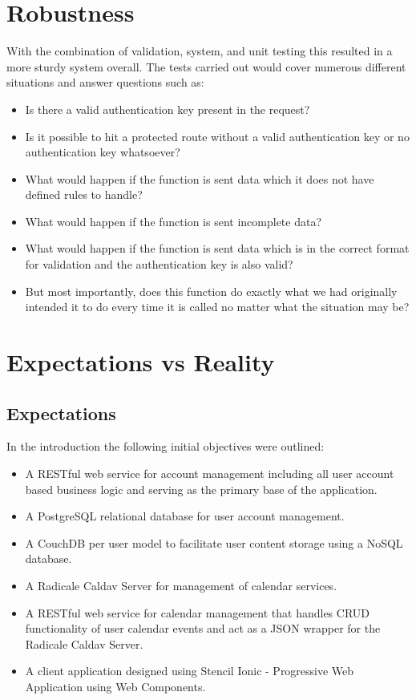 \section{Robustness}
	With the combination of validation, system, and unit testing this resulted in a more sturdy system overall. The tests carried out would cover numerous different situations and answer questions such as:
    \begin{itemize}
    \item Is there a valid authentication key present in the request?
    \item Is it possible to hit a protected route without a valid authentication key or no authentication key whatsoever? 
    \item What would happen if the function is sent data which it does not have defined rules to handle?
    \item What would happen if the function is sent incomplete data?
    \item  What would happen if the function is sent data which is in the correct format for validation and the authentication key is also valid?
    \item  But most importantly, does this function do exactly what we had originally intended it to do every time it is called no matter what the situation may be?
    \end{itemize}
    
\section{Expectations vs Reality}
	\subsection{Expectations}
	In the introduction the following initial objectives were outlined:
    \begin{itemize}
	\item{ A RESTful web service for account management including all user account based business logic and serving as the primary base of the application.}
	\item{A PostgreSQL\cite{postgres} relational database for user account management.}
	\item{A CouchDB\cite{couchdb} per user model to facilitate user content storage using a NoSQL database.}
	\item{A Radicale Caldav Server\cite{kozea} for management of calendar services.}
	\item{A RESTful web service for calendar management that handles CRUD functionality of user calendar events and act as a JSON wrapper for the Radicale Caldav Server.}
	\item{A client application designed using Stencil Ionic - Progressive Web Application using Web Components.}
	\end{itemize}
  
